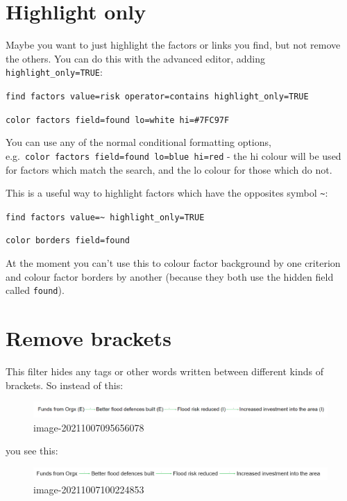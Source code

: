 \documentclass[
]{book}
\begin{document}
\hypertarget{highlight-only}{%
\section{Highlight only}\label{highlight-only}}

Maybe you want to just highlight the factors or links you find, but not remove the others. You can do this with the advanced editor, adding \texttt{highlight\_only=TRUE}:

\texttt{find\ factors\ value=risk\ operator=contains\ highlight\_only=TRUE}

\texttt{color\ factors\ field=found\ lo=white\ hi=\#7FC97F}

You can use any of the normal conditional formatting options, e.g.~\texttt{color\ factors\ field=found\ lo=blue\ hi=red} - the hi colour will be used for factors which match the search, and the lo colour for those which do not.

This is a useful way to highlight factors which have the opposites symbol \texttt{\textasciitilde{}}:

\texttt{find\ factors\ value=\textasciitilde{}\ highlight\_only=TRUE}

\texttt{color\ borders\ field=found}

At the moment you can't use this to colour factor background by one criterion and colour factor borders by another (because they both use the hidden field called \texttt{found}).

\hypertarget{remove-brackets}{%
\section{Remove brackets}\label{remove-brackets}}

This filter hides any tags or other words written between different kinds of brackets. So instead of this:

\begin{figure}
\centering
\includegraphics[width=6.77083in,height=\textheight]{_assets/image-20211007095656078.png}
\caption{image-20211007095656078}
\end{figure}

you see this:

\begin{figure}
\centering
\includegraphics[width=6.77083in,height=\textheight]{_assets/image-20211007100224853.png}
\caption{image-20211007100224853}
\end{figure}
\end{document}
